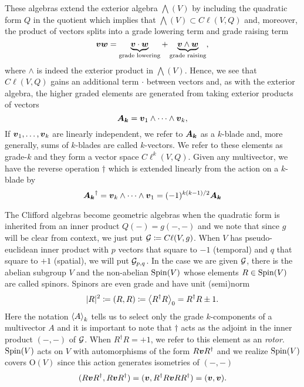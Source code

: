 \documentclass{article}
\begin{document}
These algebras extend the exterior algebra $\bigwedge(V)$ by including the quadratic form $Q$ in the quotient which implies that $\bigwedge(V)\subset C\ell(V,Q)$ and, moreover, the product of vectors splits into a grade lowering term and grade raising term
\begin{equation}
    \blade{v}\blade{w}= \underbrace{\blade{v}\cdot \blade{w}}_{\textrm{grade lowering}} +\underbrace{\blade{v}\wedge \blade{w}}_{\textrm{grade raising}},
\end{equation}
where $\wedge$ is indeed the exterior product in $\bigwedge(V)$. Hence, we see that $C\ell(V,Q)$ gains an additional term $\cdot$ between vectors and, as with the exterior algebra, the higher graded elements are generated from taking exterior products of vectors
\begin{equation}
    \blade{A_k} = \blade{v}_1 \wedge \cdots \wedge \blade{v}_k,
\end{equation}
If $\blade{v}_1,\dots,\blade{v}_k$ are linearly independent, we refer to $\blade{A_k}$ as a $k$-blade and, more generally, sums of $k$-blades are called $k$-vectors. We refer to these elements as grade-$k$ and they form a vector space $C\ell^k(V,Q)$. Given any multivector, we have the reverse operation $\dagger$ which is extended linearly from the action on a $k$-blade by
\begin{equation}
    \blade{A_k}^\dagger = \blade{v}_k\wedge \cdots \wedge \blade{v}_1 = (-1)^{k(k-1)/2} \blade{A_k}
\end{equation}

The Clifford algebras become geometric algebras when the quadratic form is inherited from an inner product $Q(-)=g(-,-)$ and we note that since $g$ will be clear from context, we just put $\G\coloneqq C\ell(V,g)$. When $V$ has pseudo-euclidean inner product with $p$ vectors that square to $-1$ (temporal) and $q$ that square to $+1$ (spatial), we will put $\G_{p,q}$. In the case we are given $\G$, there is the abelian subgroup $V$ and the non-abelian $\sping(V)$ whose elements $R\in \sping(V)$ are called spinors. Spinors are even grade and have unit (semi)norm
\begin{equation}
|R|^2 \coloneqq (R,R) \coloneqq \proj{0}{R^\dagger R}= R^\dagger R\pm 1.
\end{equation}
Here the notation $\proj{k}{A}$ tells us to select only the grade $k$-components of a multivector $A$ and it is important to note that $\dagger$ acts as the adjoint in the inner product $(-,-)$ of $\G$. When $R^\dagger R = +1$, we refer to this element as an \emph{rotor}. $\sping(V)$ acts on $V$ with automorphisms of the form $R \blade{v} R^\dagger$ and we realize $\sping(V)$ covers $\mathrm{O}(V)$ since this action generates isometries of $(-,-)$ 
\begin{equation}
    (R\blade{v}R^\dagger,R\blade{v}R^\dagger) = (\blade{v},R^\dagger R \blade{v} RR^\dagger) = (\blade{v},\blade{v}).
\end{equation}
\end{document}
